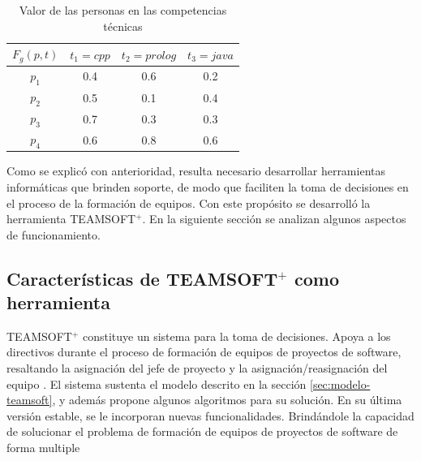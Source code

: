 \begin{table}[H]
	\centering
	\caption{Valor de las personas en las competencias técnicas}\label{pct-sof}
	\begin{tabular}{|c|c|c|c|}
		\hline
		$F_g(p,t)$ & $t_1=cpp$ & $t_2=prolog$ & $t_3=java$ \\ \hline
		  $p_1$    &    0.4    &     0.6      &    0.2     \\ \hline
		  $p_2$    &    0.5    &     0.1      &    0.4     \\ \hline
		  $p_3$    &    0.7    &     0.3      &    0.3     \\ \hline
		  $p_4$    &    0.6    &     0.8      &    0.6     \\ \hline
	\end{tabular}
\end{table}

Como se explicó con anterioridad, resulta necesario desarrollar herramientas informáticas que brinden soporte, de modo que faciliten la toma de decisiones en el proceso de la formación de equipos. Con este propósito se desarrolló la herramienta TEAMSOFT$^+$. En la siguiente sección se analizan algunos aspectos de funcionamiento.

\subsection{Características de TEAMSOFT$^+$ como herramienta}

TEAMSOFT$^+$ constituye un sistema para la toma de decisiones. Apoya a los directivos durante el proceso de formación de equipos de proyectos de software, resaltando la asignación del jefe de proyecto y la asignación/reasignación del equipo \citep{Mayi09}. El sistema sustenta el modelo descrito en la sección \ref{sec:modelo-teamsoft}, y además propone algunos algoritmos para su solución. En su última versión estable, se le incorporan nuevas funcionalidades. Brindándole la capacidad de solucionar el problema de formación de equipos de proyectos de software de forma multiple

